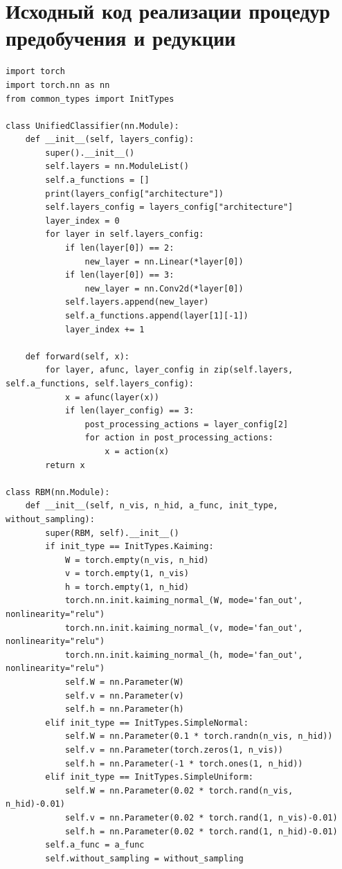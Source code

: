 \chapter{Исходный код реализации процедур предобучения и редукции}
\label{app:a}

\begin{lstlisting}[style=PythonStyle]
import torch
import torch.nn as nn
from common_types import InitTypes

class UnifiedClassifier(nn.Module):
    def __init__(self, layers_config):
        super().__init__()
        self.layers = nn.ModuleList()
        self.a_functions = []
        print(layers_config["architecture"])
        self.layers_config = layers_config["architecture"]
        layer_index = 0
        for layer in self.layers_config:
            if len(layer[0]) == 2:
                new_layer = nn.Linear(*layer[0])
            if len(layer[0]) == 3:
                new_layer = nn.Conv2d(*layer[0])
            self.layers.append(new_layer)
            self.a_functions.append(layer[1][-1])
            layer_index += 1

    def forward(self, x):
        for layer, afunc, layer_config in zip(self.layers, self.a_functions, self.layers_config):
            x = afunc(layer(x))
            if len(layer_config) == 3:
                post_processing_actions = layer_config[2]
                for action in post_processing_actions:
                    x = action(x)
        return x

class RBM(nn.Module):
    def __init__(self, n_vis, n_hid, a_func, init_type, without_sampling):
        super(RBM, self).__init__()
        if init_type == InitTypes.Kaiming:
            W = torch.empty(n_vis, n_hid)
            v = torch.empty(1, n_vis)
            h = torch.empty(1, n_hid)
            torch.nn.init.kaiming_normal_(W, mode='fan_out', nonlinearity="relu")
            torch.nn.init.kaiming_normal_(v, mode='fan_out', nonlinearity="relu")
            torch.nn.init.kaiming_normal_(h, mode='fan_out', nonlinearity="relu")
            self.W = nn.Parameter(W)
            self.v = nn.Parameter(v)
            self.h = nn.Parameter(h)
        elif init_type == InitTypes.SimpleNormal:
            self.W = nn.Parameter(0.1 * torch.randn(n_vis, n_hid))
            self.v = nn.Parameter(torch.zeros(1, n_vis))
            self.h = nn.Parameter(-1 * torch.ones(1, n_hid))
        elif init_type == InitTypes.SimpleUniform:
            self.W = nn.Parameter(0.02 * torch.rand(n_vis, n_hid)-0.01)
            self.v = nn.Parameter(0.02 * torch.rand(1, n_vis)-0.01)
            self.h = nn.Parameter(0.02 * torch.rand(1, n_hid)-0.01)
        self.a_func = a_func
        self.without_sampling = without_sampling


\end{lstlisting}
